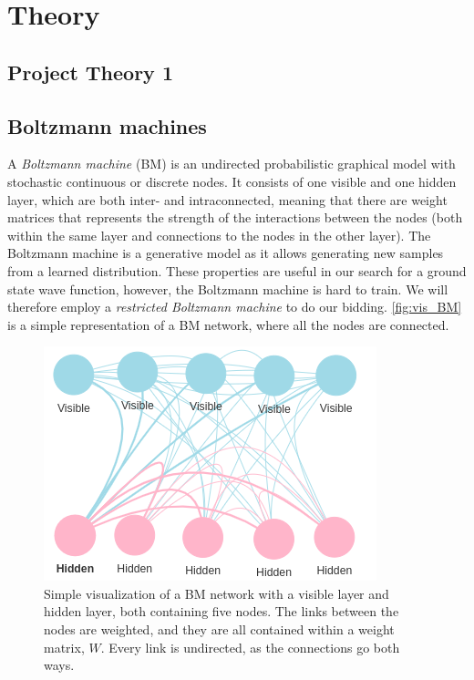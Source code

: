 \section{Theory}\label{sec:Theory}

\subsection{Project Theory 1}\label{sec:project theory}

\subsection{Boltzmann machines}
A \textit{Boltzmann machine} (BM) is an undirected probabilistic graphical model with stochastic continuous or discrete nodes. It consists of one visible and one hidden layer, which are both inter- and intraconnected, meaning that there are weight matrices that represents the strength of the interactions between the nodes (both within the same layer and connections to the nodes in the other layer). The Boltzmann machine is a generative model as it allows generating new samples from a learned distribution. These properties are useful in our search for a ground state wave function, however, the Boltzmann machine is hard to train. We will therefore employ a \textit{restricted Boltzmann machine} to do our bidding.  \autoref{fig:vis_BM} is a simple representation of a BM network, where all the nodes are connected. 

\begin{figure}[H]
\begin{center}\includegraphics[scale=0.5]{latex/latex-report/Images/vis_BM.png}
\end{center}
\caption{Simple visualization of a BM network with a visible layer and hidden layer, both containing five nodes. The links between the nodes are weighted, and they are all contained within a weight matrix, $W$. Every link is undirected, as the connections go both ways.}
\label{fig:vis_BM}
\end{figure}

